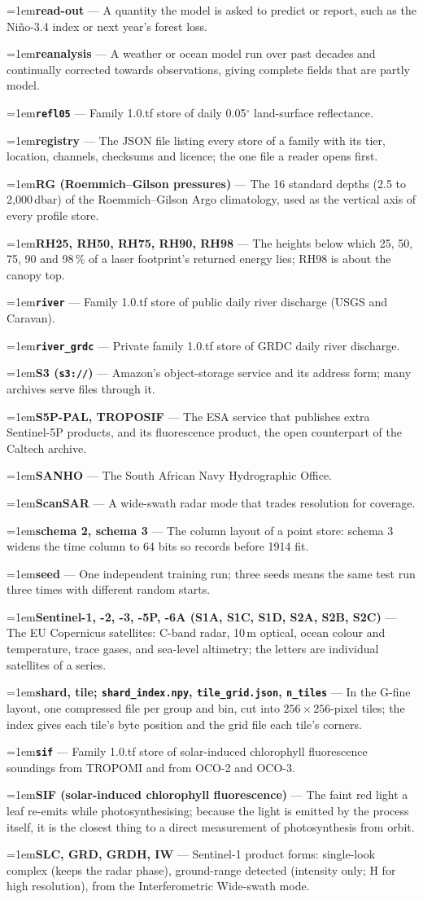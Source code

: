 \documentclass[10pt]{article}
\newcommand{\code}[1]{\texttt{#1}}
\newcommand{\gl}[2]{\par\hangindent=1em\hangafter=1\textbf{#1} --- #2\par}
\begin{document}
\gl{read-out}{A quantity the model is asked to predict or report, such as the Ni\~no-3.4 index or next year's forest loss.}
\gl{reanalysis}{A weather or ocean model run over past decades and continually corrected towards observations, giving complete fields that are partly model.}
\gl{\code{refl05}}{Family 1.0.tf store of daily 0.05$^\circ$ land-surface reflectance.}
\gl{registry}{The JSON file listing every store of a family with its tier, location, channels, checksums and licence; the one file a reader opens first.}
\gl{RG (Roemmich--Gilson pressures)}{The 16 standard depths (2.5 to 2,000\,dbar) of the Roemmich--Gilson Argo climatology, used as the vertical axis of every profile store.}
\gl{RH25, RH50, RH75, RH90, RH98}{The heights below which 25, 50, 75, 90 and 98\,\% of a laser footprint's returned energy lies; RH98 is about the canopy top.}
\gl{\code{river}}{Family 1.0.tf store of public daily river discharge (USGS and Caravan).}
\gl{\code{river\_grdc}}{Private family 1.0.tf store of GRDC daily river discharge.}
\gl{S3 (\code{s3://})}{Amazon's object-storage service and its address form; many archives serve files through it.}
\gl{S5P-PAL, TROPOSIF}{The ESA service that publishes extra Sentinel-5P products, and its fluorescence product, the open counterpart of the Caltech archive.}
\gl{SANHO}{The South African Navy Hydrographic Office.}
\gl{ScanSAR}{A wide-swath radar mode that trades resolution for coverage.}
\gl{schema 2, schema 3}{The column layout of a point store: schema 3 widens the time column to 64 bits so records before 1914 fit.}
\gl{seed}{One independent training run; three seeds means the same test run three times with different random starts.}
\gl{Sentinel-1, -2, -3, -5P, -6A (S1A, S1C, S1D, S2A, S2B, S2C)}{The EU Copernicus satellites: C-band radar, 10\,m optical, ocean colour and temperature, trace gases, and sea-level altimetry; the letters are individual satellites of a series.}
\gl{shard, tile; \code{shard\_index.npy}, \code{tile\_grid.json}, \code{n\_tiles}}{In the G-fine layout, one compressed file per group and bin, cut into $256 \times 256$-pixel tiles; the index gives each tile's byte position and the grid file each tile's corners.}
\gl{\code{sif}}{Family 1.0.tf store of solar-induced chlorophyll fluorescence soundings from TROPOMI and from OCO-2 and OCO-3.}
\gl{SIF (solar-induced chlorophyll fluorescence)}{The faint red light a leaf re-emits while photosynthesising; because the light is emitted by the process itself, it is the closest thing to a direct measurement of photosynthesis from orbit.}
\gl{SLC, GRD, GRDH, IW}{Sentinel-1 product forms: single-look complex (keeps the radar phase), ground-range detected (intensity only; H for high resolution), from the Interferometric Wide-swath mode.}
\end{document}
